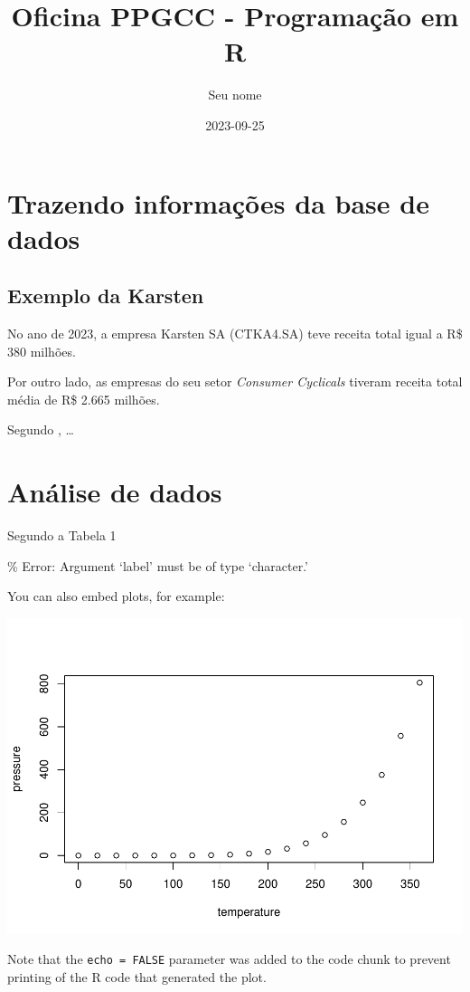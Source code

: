 \documentclass[
]{article}
\title{Oficina PPGCC - Programação em R}
\author{Seu nome}
\date{2023-09-25}
\begin{document}
\maketitle

\hypertarget{trazendo-informauxe7uxf5es-da-base-de-dados}{%
\section{Trazendo informações da base de
dados}\label{trazendo-informauxe7uxf5es-da-base-de-dados}}

\hypertarget{exemplo-da-karsten}{%
\subsection{Exemplo da Karsten}\label{exemplo-da-karsten}}

No ano de 2023, a empresa Karsten SA (CTKA4.SA) teve receita total igual
a R\$ 380 milhões.

Por outro lado, as empresas do seu setor \emph{Consumer Cyclicals}
tiveram receita total média de R\$ 2.665 milhões.

Segundo \citet{matsumoto2012}, \ldots{}

\hypertarget{anuxe1lise-de-dados}{%
\section{Análise de dados}\label{anuxe1lise-de-dados}}

Segundo a Tabela 1

\% Error: Argument `label' must be of type `character.'

You can also embed plots, for example:

\includegraphics{Dia2_files/figure-latex/pressure-1.pdf}

Note that the \texttt{echo\ =\ FALSE} parameter was added to the code
chunk to prevent printing of the R code that generated the plot.

\renewcommand\refname{References}
  
\end{document}
